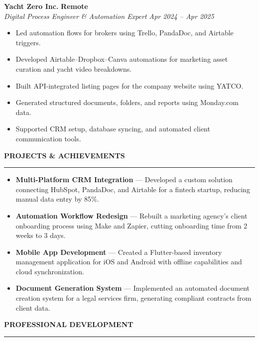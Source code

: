 \documentclass[11pt,a4paper]{article}
\newcommand{\mainsection}[1]{
    \vspace{0.3cm}
    \textbf{\textcolor{headergray}{\Large #1}}
    \vspace{0.1cm}
    
    \textcolor{mainblue}{\rule{\linewidth}{1pt}}
    \vspace{0.25cm}
}
\newcommand{\jobentry}[4]{
    \textbf{\textcolor{mainblue}{#1}} \hfill \textbf{#2}\\
    \textit{#3} \hfill \textit{#4}\\
    \vspace{0.1cm}
}
\begin{document}
\begin{minipage}[t]{0.65\textwidth}
    \vspace{0.3cm}
    \jobentry{Yacht Zero Inc.}{Remote}
    {Digital Process Engineer \& Automation Expert}{Apr 2024 -- Apr 2025}
    
    \begin{itemize}[leftmargin=1.5em, itemsep=2pt, label=\textcolor{mainblue}{\footnotesize\faAngleRight}]
        \item Led automation flows for brokers using Trello, PandaDoc, and Airtable triggers.
        \item Developed Airtable--Dropbox--Canva automations for marketing asset curation and yacht video breakdowns.
        \item Built API-integrated listing pages for the company website using YATCO.
        \item Generated structured documents, folders, and reports using Monday.com data.
        \item Supported CRM setup, database syncing, and automated client communication tools.
    \end{itemize}
    
    \mainsection{PROJECTS \& ACHIEVEMENTS}
    
    \begin{itemize}[leftmargin=1.5em, itemsep=5pt, label=\textcolor{mainblue}{\footnotesize\faCircle}]
        \item \textbf{Multi-Platform CRM Integration} — Developed a custom solution connecting HubSpot, PandaDoc, and Airtable for a fintech startup, reducing manual data entry by 85\%.
        
        \item \textbf{Automation Workflow Redesign} — Rebuilt a marketing agency's client onboarding process using Make and Zapier, cutting onboarding time from 2 weeks to 3 days.
        
        \item \textbf{Mobile App Development} — Created a Flutter-based inventory management application for iOS and Android with offline capabilities and cloud synchronization.
        
        \item \textbf{Document Generation System} — Implemented an automated document creation system for a legal services firm, generating compliant contracts from client data.
    \end{itemize}
    
    \mainsection{PROFESSIONAL DEVELOPMENT}
    

\end{minipage}
\end{document}
